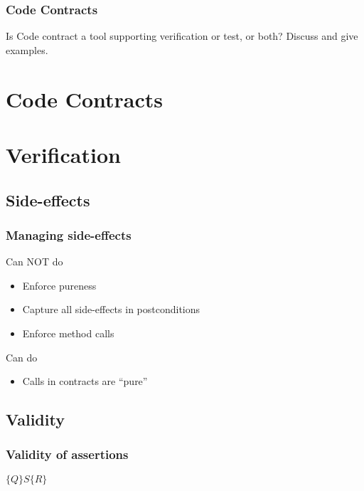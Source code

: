 

\begin{frame}
    \frametitle{Code Contracts}

    Is Code contract a tool supporting verification or test, or both? Discuss
    and give examples.
\end{frame}

\section{Code Contracts}



\section{Verification}

\subsection{Side-effects}

\begin{frame}
    \frametitle{Managing side-effects}
    \begin{block}{Can NOT do}
        \begin{itemize}
            \item Enforce pureness
            \pause \item Capture all side-effects in postconditions
            \pause \item Enforce method calls
        \end{itemize}
    \end{block}

    \pause \begin{block}{Can do}
        \begin{itemize}
            \item Calls in contracts are ``pure''
        \end{itemize}
    \end{block}
\end{frame}

\subsection{Validity}

\begin{frame}
    \frametitle{Validity of assertions}
    \center\Huge{$\{Q\}S\{R\}$}
\end{frame}

